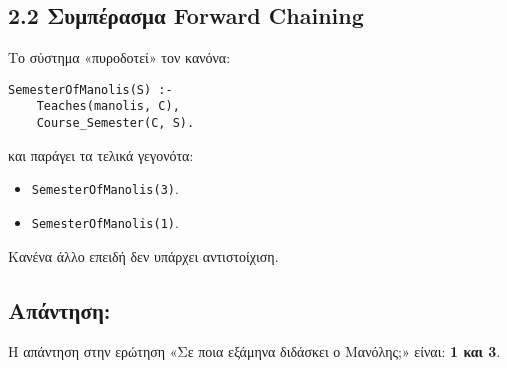 \documentclass[a4paper,12pt]{article}
\begin{document}
\subsection*{2.2 Συμπέρασμα Forward Chaining}

Το σύστημα «πυροδοτεί» τον κανόνα:
\begin{lstlisting}
SemesterOfManolis(S) :-
    Teaches(manolis, C),
    Course_Semester(C, S).
\end{lstlisting}
και παράγει τα τελικά γεγονότα:
\begin{itemize}
    \item \texttt{SemesterOfManolis(3)}.
    \item \texttt{SemesterOfManolis(1)}.
\end{itemize}

Κανένα άλλο επειδή δεν υπάρχει αντιστοίχιση.

\subsection*{Απάντηση:}

Η απάντηση στην ερώτηση «Σε ποια εξάμηνα διδάσκει ο Μανόλης;» είναι: \textbf{1 και 3}.
\end{document}
